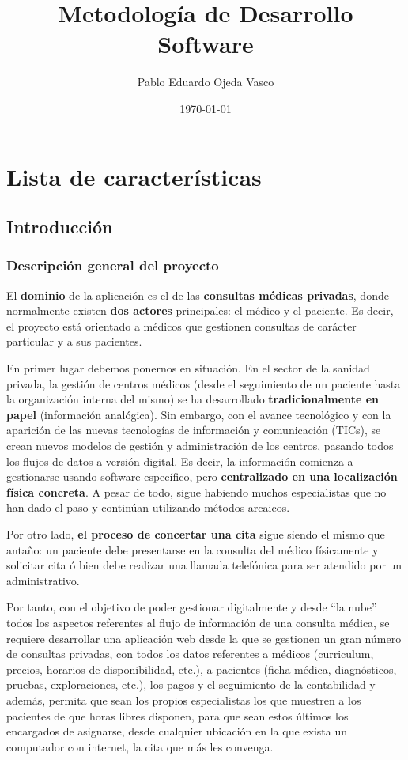 \documentclass[a4paper,oneside,11pt]{book}
\begin{document}
\title{Metodología de Desarrollo Software}
\author{Pablo Eduardo Ojeda Vasco}
\date{\today}

\maketitle

\chapter{Lista de características}
\section{Introducción}
\subsection{Descripción general del proyecto}
El {\bf dominio} de la aplicación es el de las {\bf consultas médicas privadas}, donde normalmente existen {\bf dos actores} principales: el médico y el paciente. Es decir, el proyecto está orientado a médicos que gestionen consultas de carácter particular y a sus pacientes.

	En primer lugar debemos ponernos en situación. En el sector de la sanidad privada, la gestión de centros médicos (desde el seguimiento de un paciente hasta la organización interna del mismo) se ha desarrollado {\bf tradicionalmente en papel} (información analógica). Sin embargo, con el avance tecnológico y con la aparición de las nuevas tecnologías de información y comunicación (TICs), se crean nuevos modelos de gestión y administración de los centros, pasando todos los flujos de datos a versión digital. Es decir, la información comienza a gestionarse usando software específico, pero {\bf centralizado en una localización física concreta}. A pesar de todo, sigue habiendo muchos especialistas que no han dado el paso y continúan utilizando métodos arcaicos.

	Por otro lado, {\bf el proceso de concertar una cita} sigue siendo el mismo que antaño: un paciente debe presentarse en la consulta del médico físicamente y solicitar cita ó bien debe realizar una llamada telefónica para ser atendido por un administrativo.

	Por tanto, con el objetivo de poder gestionar digitalmente y desde “la nube” todos los aspectos referentes al flujo de información de una consulta médica, se requiere desarrollar una aplicación web desde la que se gestionen un gran número de consultas privadas, con todos los datos referentes a médicos (curriculum, precios, horarios de disponibilidad, etc.), a pacientes (ficha médica, diagnósticos, pruebas, exploraciones, etc.), los pagos y el seguimiento de la contabilidad y además, permita que sean los propios especialistas los que muestren a los pacientes de que horas libres disponen, para que sean estos últimos los encargados de asignarse, desde cualquier ubicación en la que exista un computador con internet, la cita que más les convenga.
\end{document}
